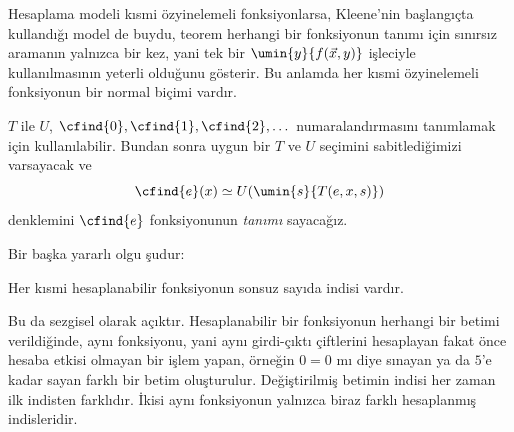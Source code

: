 \documentclass[../../../include/open-logic-section]{subfiles}
\begin{document}
Hesaplama modeli kısmi özyinelemeli fonksiyonlarsa, Kleene'nin başlangıçta
kullandığı model de buydu, teorem herhangi bir fonksiyonun tanımı için
sınırsız aramanın yalnızca bir kez, yani tek bir
$\umin{y}{f(\vec x,y)}$ işleciyle kullanılmasının yeterli olduğunu gösterir.
Bu anlamda her kısmi özyinelemeli fonksiyonun bir normal biçimi vardır.

$T$ ile $U$, $\cfind{0},\cfind{1},\cfind{2},\dots$ numaralandırmasını
tanımlamak için kullanılabilir. Bundan sonra uygun bir $T$ ve $U$ seçimini
sabitlediğimizi varsayacak ve
\[
  \cfind{e}(x)\simeq U(\umin{s}{T(e,x,s)})
\]
denklemini $\cfind{e}$ fonksiyonunun \emph{tanımı} sayacağız.

Bir başka yararlı olgu şudur:

\begin{thm}
Her kısmi hesaplanabilir fonksiyonun sonsuz sayıda indisi vardır.
\end{thm}

Bu da sezgisel olarak açıktır. Hesaplanabilir bir fonksiyonun herhangi bir
betimi verildiğinde, aynı fonksiyonu, yani aynı girdi-çıktı çiftlerini
hesaplayan fakat önce hesaba etkisi olmayan bir işlem yapan, örneğin
$0=0$ mı diye sınayan ya da $5$'e kadar sayan farklı bir betim oluşturulur.
Değiştirilmiş betimin indisi her zaman ilk indisten farklıdır. İkisi aynı
fonksiyonun yalnızca biraz farklı hesaplanmış indisleridir.
\end{document}
